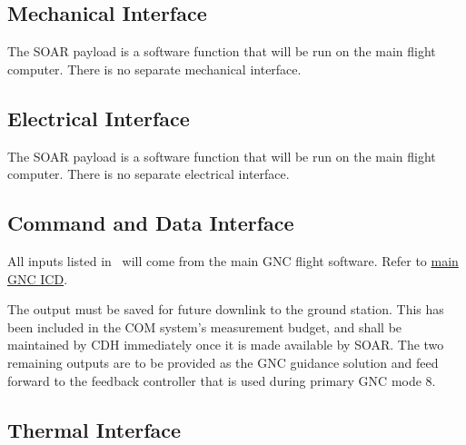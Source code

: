 \documentclass[10pt]{article}
\begin{document}

\subsection{Mechanical Interface}\label{sec2:mech_interface}

The SOAR payload is a software function that will be run on the main flight computer. There is no separate mechanical interface.

\subsection{Electrical Interface}\label{sec2:elec_interface}

The SOAR payload is a software function that will be run on the main flight computer. There is no separate electrical interface.

\subsection{Command and Data Interface}\label{sec2:cmd_interface}

All inputs listed in~ will come from the main GNC flight software. Refer to \href{https://drive.google.com/open?id=1wTjmsQdXGk9jmEHy59fZAdBJJ3r1IE4LGFjHT2S5png}{main GNC ICD}.

The output  must be saved for future downlink to the ground station. This has been included in the COM system's measurement budget, and shall be maintained by CDH immediately once it is made available by SOAR. The two remaining outputs are to be provided as the GNC guidance solution and feed forward to the feedback controller that is used during primary GNC mode $8$. 

\subsection{Thermal Interface}\label{sec2:thermal_interface}
\end{document}
